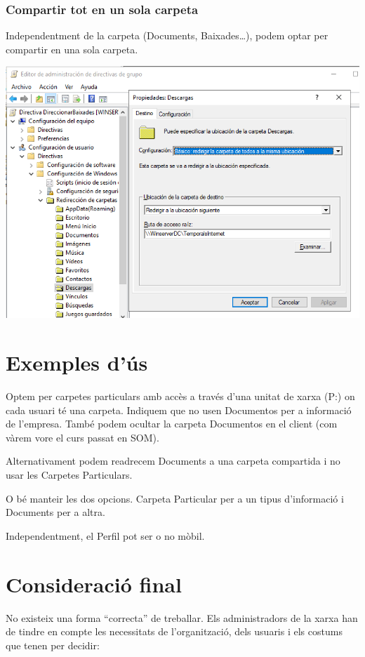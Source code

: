 \documentclass[
  a4paper,
]{article}
\begin{document}
\subsubsection{Compartir tot en un sola
carpeta}\label{compartir-tot-en-un-sola-carpeta}

Independentment de la carpeta (Documents, Baixades\ldots), podem optar
per compartir en una sola carpeta.

\includegraphics{png/CrearCarpetaRuta2.png}

\section{Exemples d'ús}\label{exemples-duxfas}

Optem per carpetes particulars amb accès a través d'una unitat de xarxa
(P:) on cada usuari té una carpeta. Indiquem que no usen Documentos per
a informació de l'empresa. També podem ocultar la carpeta Documentos en
el client (com vàrem vore el curs passat en SOM).

Alternativament podem readrecem Documents a una carpeta compartida i no
usar les Carpetes Particulars.

O bé manteir les dos opcions. Carpeta Particular per a un tipus
d'informació i Documents per a altra.

Independentment, el Perfil pot ser o no mòbil.

\section{Consideració final}\label{consideraciuxf3-final}

No existeix una forma ``correcta'' de treballar. Els administradors de
la xarxa han de tindre en compte les necessitats de l'organització, dels
usuaris i els costums que tenen per decidir:
\end{document}
